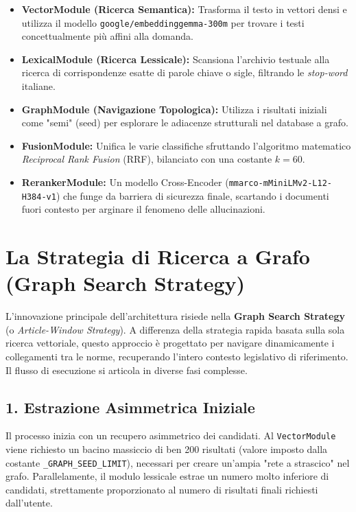 \begin{itemize}
    \item \textbf{VectorModule (Ricerca Semantica):} Trasforma il testo in vettori densi e utilizza il modello \texttt{google/embeddinggemma-300m} per trovare i testi concettualmente più affini alla domanda.
    \item \textbf{LexicalModule (Ricerca Lessicale):} Scansiona l'archivio testuale alla ricerca di corrispondenze esatte di parole chiave o sigle, filtrando le \textit{stop-word} italiane.
    \item \textbf{GraphModule (Navigazione Topologica):} Utilizza i risultati iniziali come "semi" (seed) per esplorare le adiacenze strutturali nel database a grafo.
    \item \textbf{FusionModule:} Unifica le varie classifiche sfruttando l'algoritmo matematico \textit{Reciprocal Rank Fusion} (RRF), bilanciato con una costante $k = 60$.
    \item \textbf{RerankerModule:} Un modello Cross-Encoder (\texttt{mmarco-mMiniLMv2-L12-H384-v1}) che funge da barriera di sicurezza finale, scartando i documenti fuori contesto per arginare il fenomeno delle allucinazioni.
\end{itemize}

\section{La Strategia di Ricerca a Grafo (Graph Search Strategy)}
L'innovazione principale dell'architettura risiede nella \textbf{Graph Search Strategy} (o \textit{Article-Window Strategy}). A differenza della strategia rapida basata sulla sola ricerca vettoriale, questo approccio è progettato per navigare dinamicamente i collegamenti tra le norme, recuperando l'intero contesto legislativo di riferimento. Il flusso di esecuzione si articola in diverse fasi complesse.

\subsection{1. Estrazione Asimmetrica Iniziale}
Il processo inizia con un recupero asimmetrico dei candidati. Al \texttt{VectorModule} viene richiesto un bacino massiccio di ben 200 risultati (valore imposto dalla costante \texttt{\_GRAPH\_SEED\_LIMIT}), necessari per creare un'ampia "rete a strascico" nel grafo. Parallelamente, il modulo lessicale estrae un numero molto inferiore di candidati, strettamente proporzionato al numero di risultati finali richiesti dall'utente.

